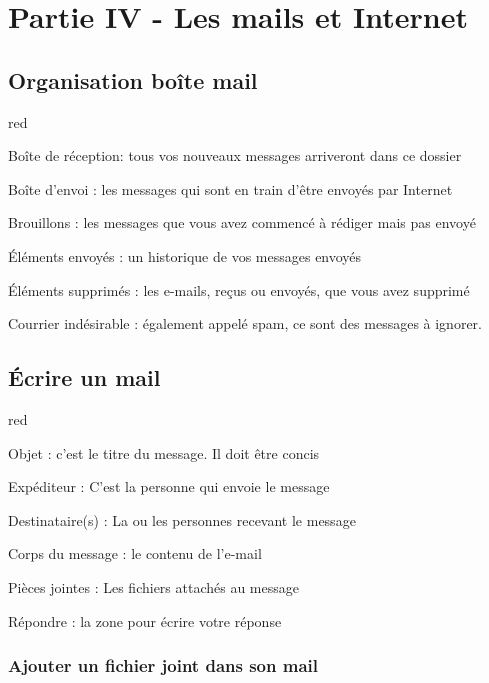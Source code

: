 {\section{Partie IV - Les mails et Internet}

\subsection{Organisation boîte mail}

\begin{items}{red}{\Circle}
\item Boîte de réception: tous vos nouveaux messages arriveront dans ce dossier
\item Boîte d’envoi : les messages qui sont en train d’être envoyés par Internet
\item Brouillons : les messages que vous avez commencé à rédiger mais pas envoyé
\item Éléments envoyés : un historique de vos messages envoyés
\item Éléments supprimés : les e-mails, reçus ou envoyés, que vous avez supprimé
\item Courrier indésirable : également appelé spam, ce sont des messages à ignorer. 

\end{items}

\subsection{Écrire un mail}

\begin{items}{red}{\Circle}
\item Objet : c’est le titre du message. Il doit être concis
\item Expéditeur : C’est la personne qui envoie le message
\item Destinataire(s) : La ou les personnes recevant le message
\item Corps du message : le contenu de l’e-mail
\item Pièces jointes : Les fichiers attachés au message
\item Répondre : la zone pour écrire votre réponse
\end{items}

\subsubsection{Ajouter un fichier joint dans son mail}

}
